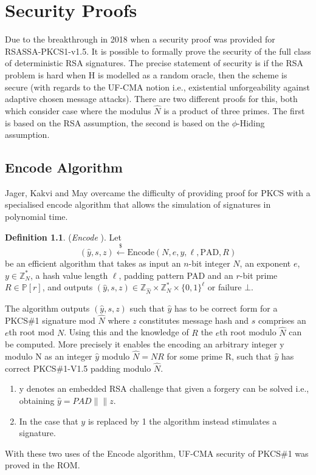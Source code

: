 \documentclass[]{final_report}
\theoremstyle{definition}
\newtheorem{definition}{Definition}[chapter]
\begin{document}
\chapter{Security Proofs}
Due to the breakthrough in 2018 when a security proof \cite{jager2018security}  was provided for RSASSA-PKCS1-v1.5. It is possible to formally prove the security of the full class of deterministic RSA signatures. The precise statement of security is if the RSA problem is hard when H is modelled as a random oracle, then the scheme is secure (with regards to the UF-CMA notion i.e.,  existential unforgeability against adaptive chosen message attacks). There are two different proofs for this, both which consider case where the modulus $\widehat{N}$ is a product of three primes. The first is based on the RSA assumption, the second is based on the $\phi$-Hiding assumption.


\section{Encode Algorithm}


Jager, Kakvi and May overcame the difficulty of providing proof for PKCS with a specialised encode algorithm that allows the simulation of signatures in polynomial time.  

\begin{definition} (\textit{Encode} \cite{jager2018security}).
Let
\[
(\widehat{y}, s, z) \xleftarrow{\$} \text{Encode}(N, e, y, \ell, \text{PAD}, R)
\]
be an efficient algorithm that takes as input an \(n\)-bit integer \(N\), an exponent \(e\), \(y \in \mathbb{Z}_N^*\), a hash value length $\ell$, padding pattern PAD and an \(r\)-bit prime \(R \in \mathbb{P}[r]\), and outputs \((\widehat{y}, s, z) \in \mathbb{Z}_{\widehat{N}} \times \mathbb{Z}_N^* \times \{0, 1\}^\ell\) or failure \(\bot\). \

\end{definition}

The algorithm outputs \((\widehat{y}, s, z)\) such that \(\widehat{y}\) has to be correct form for a PKCS\#1 signature mod \(\widehat{N}\) where \(z\) constitutes message hash and \(s\) comprises an \(e\)th root mod \(N\). Using this and the knowledge of \(R\) the \(e\)th root modulo \(\widehat{N}\) can be computed. More precisely it enables the encoding an arbitrary integer y modulo N as an integer $\hat{y}$ modulo $\hat{N} = NR$ for some prime R, such that $\hat{y}$ has correct PKCS\#1-V1.5 padding modulo $\hat{N}$.

\begin{enumerate}
\item y denotes an embedded RSA challenge that given a forgery can be solved i.e., obtaining \(\widehat{y} = PAD\|\|z \). 
\item In the case that \(y\) is replaced by 1 the algorithm instead stimulates a signature. 
\end{enumerate}
With these two uses of the Encode algorithm, UF-CMA security of PKCS\#1 was proved in the ROM. 
\end{document}
